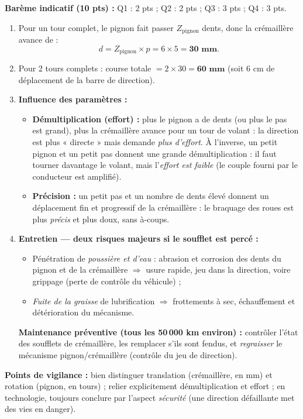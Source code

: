 \documentclass[11pt]{article}
\begin{document}
\begin{corrige}
\textbf{Barème indicatif (10 pts) :} Q1 : 2 pts ; Q2 : 2 pts ; Q3 : 3 pts ; Q4 : 3 pts.

\begin{enumerate}
    \item Pour un tour complet, le pignon fait passer $Z_{\text{pignon}}$ dents, donc la crémaillère avance de :
    \[ d = Z_{\text{pignon}} \times p = 6 \times 5 = \textbf{30 mm}. \]
    \item Pour 2 tours complets : course totale $= 2 \times 30 = \textbf{60 mm}$ (soit 6 cm de déplacement de la barre de direction).
    \item \textbf{Influence des paramètres :}
    \begin{itemize}
        \item \textbf{Démultiplication (effort) :} plus le pignon a de dents (ou plus le pas est grand), plus la crémaillère avance pour un tour de volant : la direction est plus « directe » mais demande \emph{plus d'effort}. À l'inverse, un petit pignon et un petit pas donnent une grande démultiplication : il faut tourner davantage le volant, mais l'\emph{effort est faible} (le couple fourni par le conducteur est amplifié).
        \item \textbf{Précision :} un petit pas et un nombre de dents élevé donnent un déplacement fin et progressif de la crémaillère : le braquage des roues est plus \emph{précis} et plus doux, sans à-coups.
    \end{itemize}
    \item \textbf{Entretien — deux risques majeurs si le soufflet est percé :}
    \begin{itemize}
        \item Pénétration de \emph{poussière et d'eau} : abrasion et corrosion des dents du pignon et de la crémaillère $\Rightarrow$ usure rapide, jeu dans la direction, voire grippage (perte de contrôle du véhicule) ;
        \item \emph{Fuite de la graisse} de lubrification $\Rightarrow$ frottements à sec, échauffement et détérioration du mécanisme.
    \end{itemize}
    \textbf{Maintenance préventive (tous les 50\,000 km environ) :} contrôler l'état des soufflets de crémaillère, les remplacer s'ils sont fendus, et \emph{regraisser} le mécanisme pignon/crémaillère (contrôle du jeu de direction).
\end{enumerate}
\textbf{Points de vigilance :} bien distinguer translation (crémaillère, en mm) et rotation (pignon, en tours) ; relier explicitement démultiplication et effort ; en technologie, toujours conclure par l'aspect \emph{sécurité} (une direction défaillante met des vies en danger).
\end{corrige}
\end{document}
